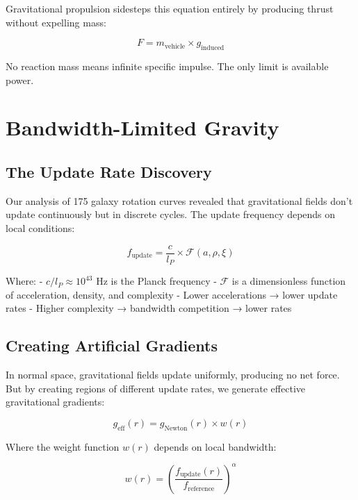 \documentclass[12pt,letterpaper]{book}
\theoremstyle{definition}
\theoremstyle{plain}
\theoremstyle{remark}
\begin{document}
{{{{{Gravitational propulsion sidesteps this equation entirely by producing thrust without expelling mass:

\begin{equation}
F = m_{\text{vehicle}} \times g_{\text{induced}}
\end{equation}

No reaction mass means infinite specific impulse. The only limit is available power.

\section{Bandwidth-Limited Gravity}

\subsection{The Update Rate Discovery}

Our analysis of 175 galaxy rotation curves revealed that gravitational fields don't update continuously but in discrete cycles. The update frequency depends on local conditions:

\begin{equation}
f_{\text{update}} = \frac{c}{l_P} \times \mathcal{F}(a, \rho, \xi)
\end{equation}

Where:
- $c/l_P \approx 10^{43}$ Hz is the Planck frequency
- $\mathcal{F}$ is a dimensionless function of acceleration, density, and complexity
- Lower accelerations → lower update rates
- Higher complexity → bandwidth competition → lower rates

\subsection{Creating Artificial Gradients}

In normal space, gravitational fields update uniformly, producing no net force. But by creating regions of different update rates, we generate effective gravitational gradients:

\begin{equation}
g_{\text{eff}}(r) = g_{\text{Newton}}(r) \times w(r)
\end{equation}

Where the weight function $w(r)$ depends on local bandwidth:

\begin{equation}
w(r) = \left(\frac{f_{\text{update}}(r)}{f_{\text{reference}}}\right)^{\alpha}
\end{equation}

}}}}}
\end{document}
